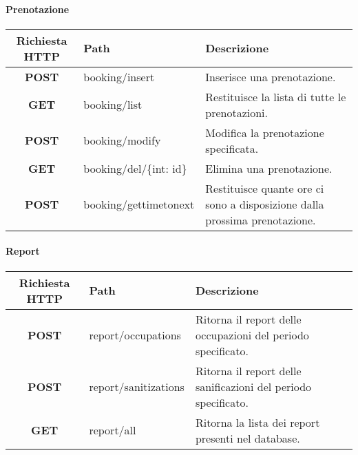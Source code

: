 \paragraph{Prenotazione}
\begin{center}
	\begin{longtable}{|c|p{7cm}|p{5cm}|}
		\hline
		\rowcolor{lighter-grayer}
		\textbf{Richiesta HTTP} & \textbf{Path} & \textbf{Descrizione}\\		
		\hline
		\endfirsthead
		\textbf{POST} & booking/insert & Inserisce una prenotazione.\\
		\hline
		\textbf{GET} & booking/list & Restituisce la lista di tutte le prenotazioni.\\
		\hline
		\textbf{POST} & booking/modify & Modifica la prenotazione specificata.\\
		\hline
		\textbf{GET} & booking/del/\{int: id\} & Elimina una prenotazione.\\
		\hline
		\textbf{POST} & booking/gettimetonext & Restituisce quante ore ci sono a disposizione dalla prossima prenotazione.\\
		\hline
	\end{longtable}
\end{center}
\paragraph{Report}
\begin{center}
	\begin{longtable}{|c|p{7cm}|p{5cm}|}
		\hline
		\rowcolor{lighter-grayer}
		\textbf{Richiesta HTTP} & \textbf{Path} & \textbf{Descrizione}\\		
		\hline
		\endfirsthead
		\textbf{POST} & report/occupations & Ritorna il report delle occupazioni del periodo specificato.\\
		\hline
		\textbf{POST} & report/sanitizations & Ritorna il report delle sanificazioni del periodo specificato.\\
		\hline
		\textbf{GET} & report/all & Ritorna la lista dei report presenti nel database.\\
		\hline
	\end{longtable}
\end{center}
